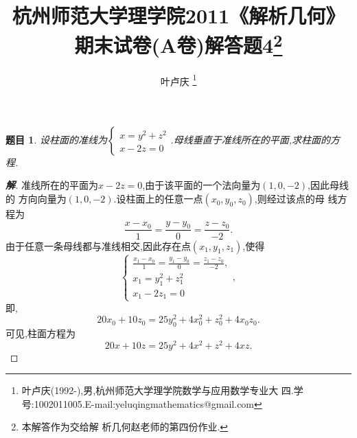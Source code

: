 ﻿\documentclass[a4paper]{article}
\newtheorem*{exe}{题目}
\newenvironment{exercise}
{\bigskip\begin{mdframed}\begin{exe}}
    {\end{exe}\end{mdframed}\bigskip}
\numberwithin{equation}{section}
\begin{document}
\title{{\bf{杭州师范大学理学院2011《解析几何》期末试卷(A卷)解答题4\footnote{本解答作为交给解
        析几何赵老师的第四份作业.}}}} \author{\small{叶卢庆
    \footnote{叶卢庆(1992-),男,杭州师范大学理学院数学与应用数学专业大
      四.学号:1002011005.E-mail:yeluqingmathematics@gmail.com}}}
\maketitle
\begin{exercise}
设柱面的准线为$
\begin{cases}
  x=y^2+z^2\\
x-2z=0
\end{cases}
$.母线垂直于准线所在的平面,求柱面的方程.
\end{exercise}
\begin{proof}[\textbf{解}]
准线所在的平面为$x-2z=0$,由于该平面的一个法向量为$(1,0,-2)$,因此母线的
方向向量为$(1,0,-2)$.设柱面上的任意一点$(x_0,y_0,z_0)$,则经过该点的母
线方程为
$$
\frac{x-x_0}{1}=\frac{y-y_{0}}{0}=\frac{z-z_0}{-2}.
$$
由于任意一条母线都与准线相交,因此存在点$(x_1,y_1,z_1)$,使得
$$
\begin{cases}
  \frac{x_{1}-x_0}{1}=\frac{y_{1}-y_{0}}{0}=\frac{z_{1}-z_0}{-2},\\
  x_{1}=y_{1}^2+z_{1}^2\\
x_{1}-2z_{1}=0
\end{cases},
$$
即,
$$
20x_{0}+10z_{0}=25y_0^2+4x_0^2+z_0^2+4x_0z_{0}.
$$
可见,柱面方程为
$$
20x+10z=25y^2+4x^2+z^2+4xz.
$$
\end{proof}
\end{document}
